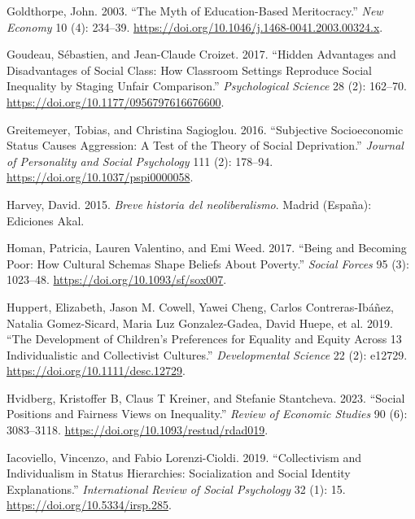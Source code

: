 \documentclass[
  letterpaper,
  DIV=11,
  numbers=noendperiod]{scrartcl}
\newlength{\cslhangindent}
\newenvironment{CSLReferences}[2] %
 {\begin{list}{}{%
  \setlength{\itemindent}{0pt}
  \setlength{\leftmargin}{0pt}
  \setlength{\parsep}{0pt}
  \ifodd #1
   \setlength{\leftmargin}{\cslhangindent}
   \setlength{\itemindent}{-1\cslhangindent}
  \fi
  \setlength{\itemsep}{#2\baselineskip}}}
 {\end{list}}
\begin{document}
\begin{CSLReferences}{1}{0}
Goldthorpe, John. 2003. {``The Myth of Education-Based Meritocracy.''}
\emph{New Economy} 10 (4): 234--39.
\url{https://doi.org/10.1046/j.1468-0041.2003.00324.x}.

Goudeau, Sébastien, and Jean-Claude Croizet. 2017. {``Hidden
{Advantages} and {Disadvantages} of {Social Class}: {How Classroom
Settings Reproduce Social Inequality} by {Staging Unfair Comparison}.''}
\emph{Psychological Science} 28 (2): 162--70.
\url{https://doi.org/10.1177/0956797616676600}.

Greitemeyer, Tobias, and Christina Sagioglou. 2016. {``Subjective
Socioeconomic Status Causes Aggression: {A} Test of the Theory of Social
Deprivation.''} \emph{Journal of Personality and Social Psychology} 111
(2): 178--94. \url{https://doi.org/10.1037/pspi0000058}.

Harvey, David. 2015. \emph{{Breve historia del neoliberalismo}}. Madrid
(Espa{ñ}a): Ediciones Akal.

Homan, Patricia, Lauren Valentino, and Emi Weed. 2017. {``Being and
{Becoming Poor}: {How Cultural Schemas Shape Beliefs About Poverty}.''}
\emph{Social Forces} 95 (3): 1023--48.
\url{https://doi.org/10.1093/sf/sox007}.

Huppert, Elizabeth, Jason M. Cowell, Yawei Cheng, Carlos
Contreras-Ibáñez, Natalia Gomez-Sicard, Maria Luz Gonzalez-Gadea, David
Huepe, et al. 2019. {``The Development of Children's Preferences for
Equality and Equity Across 13 Individualistic and Collectivist
Cultures.''} \emph{Developmental Science} 22 (2): e12729.
\url{https://doi.org/10.1111/desc.12729}.

Hvidberg, Kristoffer B, Claus T Kreiner, and Stefanie Stantcheva. 2023.
{``Social {Positions} and {Fairness Views} on {Inequality}.''}
\emph{Review of Economic Studies} 90 (6): 3083--3118.
\url{https://doi.org/10.1093/restud/rdad019}.

Iacoviello, Vincenzo, and Fabio Lorenzi-Cioldi. 2019. {``Collectivism
and {Individualism} in {Status Hierarchies}: {Socialization} and {Social
Identity Explanations}.''} \emph{International Review of Social
Psychology} 32 (1): 15. \url{https://doi.org/10.5334/irsp.285}.


\end{CSLReferences}
\end{document}
